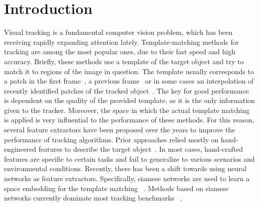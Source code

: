 \documentclass{article}
\begin{document}
\section{Introduction}
Visual tracking is a fundamental computer vision problem, which has been receiving rapidly expanding attention lately. Template-matching methods for tracking are among the most popular ones, due to their fast speed and high accuracy. Briefly, these methods use a template of the target object and try to match it to regions of the image in question. The template usually corresponds to a patch in the first frame~\cite{bertinetto2016fully,tao2016siamese,li2018high,zhu2018distractor}, a previous frame~\cite{held2016learning} or in some cases an interpolation of recently identified patches of the tracked object~\cite{valmadre2017end}. The key for good performance is dependent on the quality of the provided template, as it is the only information given to the tracker. Moreover, the space in which the actual template matching is applied is very influential to the performance of these methods. 
For this reason, several feature extractors have been proposed over the years to improve the performance of tracking algorithms. Prior approaches relied mostly on hand-engineered features to describe the target object~\cite{olson1997automatic,steger2002occlusion,hofhauser2008edge,mohr2009continuous}. In most cases, hand-crafted features are specific to certain tasks and fail to generalize to various scenarios and environmental conditions. Recently, there has been a shift towards using neural networks as feature extractors. Specifically, siamese networks are used to learn a space embedding for the template matching ~\cite{bertinetto2016fully}. Methods based on siamese networks currently dominate most tracking benchmarks ~\cite{VOT_TPAMI, OTB2015}.
\end{document}
